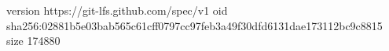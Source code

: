 version https://git-lfs.github.com/spec/v1
oid sha256:02881b5e03bab565c61cff0797cc97feb3a49f30dfd6131dae173112bc9c8815
size 174880
